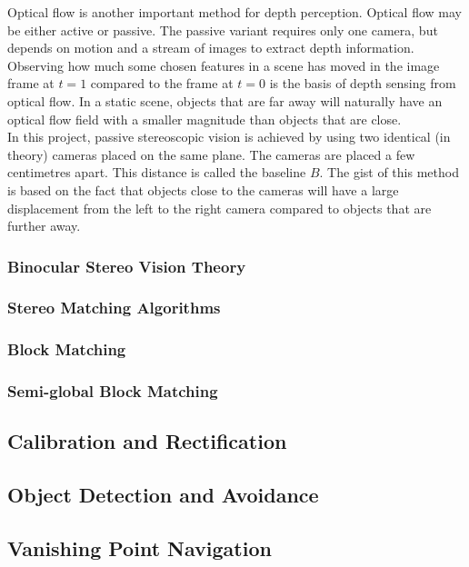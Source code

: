 Optical flow is another important method for depth perception. Optical flow may be either active or passive. The passive variant requires  only one camera, but depends on motion and a stream of images to extract depth information. Observing how much some chosen features in a scene has moved in the image frame at $t = 1$ compared to the frame at $t = 0$ is the basis of depth sensing from optical flow. In a static scene, objects that are far away will naturally have an optical flow field with a smaller magnitude than objects that are close. \\

In this project, passive stereoscopic vision is achieved by using two identical (in theory) cameras placed on the same plane. The cameras are placed a few centimetres apart. This distance is called the baseline $B$. The gist of this method is based on the fact that objects close to the cameras will have a large displacement from the left to the right camera compared to objects that are further away. 

\subsubsection{Binocular Stereo Vision Theory}

\subsubsection{Stereo Matching Algorithms}

\subsubsection{Block Matching}

\subsubsection{Semi-global Block Matching}

\subsection{Calibration and Rectification}


\subsection{Object Detection and Avoidance}

\subsection{Vanishing Point Navigation}

